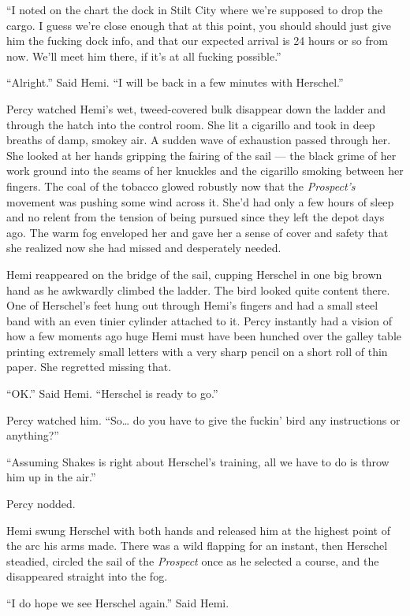 \documentclass[]{scrbook}
\begin{document}
``I noted on the chart the dock in Stilt City where we're supposed to
drop the cargo. I guess we're close enough that at this point, you
should should just give him the fucking dock info, and that our expected
arrival is 24 hours or so from now. We'll meet him there, if it's at all
fucking possible.''

``Alright.'' Said Hemi. ``I will be back in a few minutes with
Herschel.''

Percy watched Hemi's wet, tweed-covered bulk disappear down the ladder
and through the hatch into the control room. She lit a cigarillo and
took in deep breaths of damp, smokey air. A sudden wave of exhaustion
passed through her. She looked at her hands gripping the fairing of the
sail --- the black grime of her work ground into the seams of her
knuckles and the cigarillo smoking between her fingers. The coal of the
tobacco glowed robustly now that the \emph{Prospect's} movement was
pushing some wind across it. She'd had only a few hours of sleep and no
relent from the tension of being pursued since they left the depot days
ago. The warm fog enveloped her and gave her a sense of cover and safety
that she realized now she had missed and desperately needed.

Hemi reappeared on the bridge of the sail, cupping Herschel in one big
brown hand as he awkwardly climbed the ladder. The bird looked quite
content there. One of Herschel's feet hung out through Hemi's fingers
and had a small steel band with an even tinier cylinder attached to it.
Percy instantly had a vision of how a few moments ago huge Hemi must
have been hunched over the galley table printing extremely small letters
with a very sharp pencil on a short roll of thin paper. She regretted
missing that.

``OK.'' Said Hemi. ``Herschel is ready to go.''

Percy watched him. ``So\ldots{} do you have to give the fuckin' bird any
instructions or anything?''

``Assuming Shakes is right about Herschel's training, all we have to do
is throw him up in the air.''

Percy nodded.

Hemi swung Herschel with both hands and released him at the highest
point of the arc his arms made. There was a wild flapping for an
instant, then Herschel steadied, circled the sail of the \emph{Prospect}
once as he selected a course, and the disappeared straight into the fog.

``I do hope we see Herschel again.'' Said Hemi.
\end{document}
